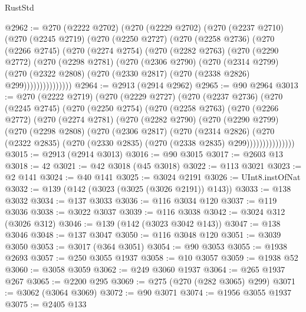 \begin{lexlean}{RustStd}
\begin{coremodule}
@2962 := @270
    (@2222 @2702)
    (@270
      (@2229 @2702)
      (@270
        (@2237 @2710)
        (@270
          (@2245 @2719)
          (@270
            (@2250 @2727)
            (@270
              (@2258 @2736)
              (@270
                (@2266 @2745)
                (@270
                  (@2274 @2754)
                  (@270
                    (@2282 @2763)
                    (@270
                      (@2290 @2772)
                      (@270
                        (@2298 @2781)
                        (@270
                          (@2306 @2790)
                          (@270
                            (@2314 @2799)
                            (@270
                              (@2322 @2808)
                              (@270 (@2330 @2817) (@270 (@2338 @2826) @299)))))))))))))))
@2964 := @2913 (@2914 @2962)
@2965 := @90 @2964
@3013 := @270
    (@2222 @2719)
    (@270
      (@2229 @2727)
      (@270
        (@2237 @2736)
        (@270
          (@2245 @2745)
          (@270
            (@2250 @2754)
            (@270
              (@2258 @2763)
              (@270
                (@2266 @2772)
                (@270
                  (@2274 @2781)
                  (@270
                    (@2282 @2790)
                    (@270
                      (@2290 @2799)
                      (@270
                        (@2298 @2808)
                        (@270
                          (@2306 @2817)
                          (@270
                            (@2314 @2826)
                            (@270
                              (@2322 @2835)
                              (@270 (@2330 @2835) (@270 (@2338 @2835) @299)))))))))))))))
@3015 := @2913 (@2914 @3013)
@3016 := @90 @3015
@3017 := @2603 @13
@3018 := 42
@3021 := @42 @3018 (@45 @3018)
@3022 := @113 @3021
@3023 := @2 @141
@3024 := @40 @141
@3025 := @3024 @2191
@3026 := UInt8.instOfNat
@3032 := @139 (@142 (@3023 (@3025 (@3026 @2191)) @143))
@3033 := @138 @3032
@3034 := @137 @3033
@3036 := @116 @3034 @120
@3037 := @119 @3036
@3038 := @3022 @3037
@3039 := @116 @3038
@3042 := @3024 @312 (@3026 @312)
@3046 := @139 (@142 (@3023 @3042 @143))
@3047 := @138 @3046
@3048 := @137 @3047
@3050 := @116 @3048 @120
@3051 := @3039 @3050
@3053 := @3017 (@364 @3051)
@3054 := @90 @3053
@3055 := @1938 @2693
@3057 := @250 @3055 @1937
@3058 := @10 @3057
@3059 := @1938 @52
@3060 := @3058 @3059
@3062 := @249 @3060 @1937
@3064 := @265 @1937 @267
@3065 := @2200 @295
@3069 := @275 (@270 (@282 @3065) @299)
@3071 := @3062 (@3064 @3069)
@3072 := @90 @3071
@3074 := @1956 @3055 @1937
@3075 := @2405 @133

\end{coremodule}
\end{lexlean}
